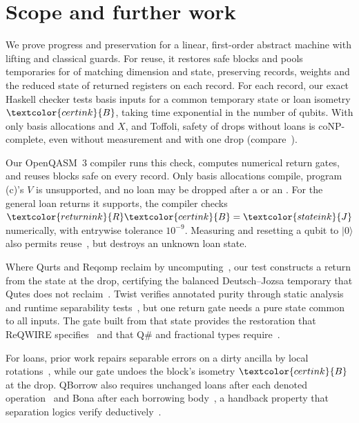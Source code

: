 \documentclass[acmsmall,11pt,screen,review,anonymous,nonacm]{acmart}
\begin{document}
\section{Scope and further work}\label{sec:status}

We prove progress and preservation for a linear, first-order abstract machine with lifting and classical
guards. For reuse, it restores safe blocks and pools temporaries for  of matching dimension and
state, preserving records, weights and the reduced state of returned registers on each record.
For each record, our exact Haskell checker tests basis inputs for a common temporary state
or loan isometry $\textcolor{certink}{B}$, taking time exponential in the number of qubits. With only basis allocations and
$X$,  and Toffoli,
safety of drops without loans is coNP-complete, even without measurement and with one drop
(compare~\cite[Cor.~3.1]{Liu2026Uncomputation}).

Our OpenQASM~3 compiler runs this check, computes numerical return gates, and reuses blocks safe on every record.
Only basis allocations compile, program (c)'s $V$ is unsupported, and no loan may be dropped after a
 or an . For the general loan returns it supports, the compiler checks $\textcolor{returnink}{R}\textcolor{certink}{B}=\textcolor{stateink}{J}$ numerically, with entrywise tolerance $10^{-9}$.
Measuring and resetting a qubit to $|0\rangle$ also permits reuse~\cite{DeCross2023QubitReuse,Hua2023CaQR}, but destroys an unknown loan state.

Where Qurts and Reqomp reclaim by uncomputing~\cite{Hirata2025Qurts,Paradis2024Reqomp}, our test constructs
 a return from the state at the drop, certifying the balanced Deutsch--Jozsa temporary that Qutes does not
reclaim~\cite[Defs.~2--6]{Faro2026Qutes}. Twist verifies annotated purity through static analysis and runtime
separability tests~\cite[\S1.3]{Yuan2022Twist}, but one return gate needs a pure state common to all inputs. The gate built from that state provides
the restoration that ReQWIRE
specifies~\cite[\S3]{Rand2019ReQWIRE} and that Q\# and fractional types
require~\cite{MicrosoftQsharpMemory,Chen2020Fractional}.

For loans, prior work repairs separable errors on a dirty ancilla by local rotations~\cite[\S5.2, Alg.~2]{Li2026AncillaSafety},
while our gate undoes the block's isometry $\textcolor{certink}{B}$ at the drop. QBorrow also requires unchanged loans after each
denoted operation~\cite[Def.~5.1]{Su2025Borrowing} and Bona after each borrowing body~\cite[Def.~3.2]{Xu2026Bona},
a handback property that separation logics verify deductively~\cite{Matsushita2026RapunSL,Su2024Heap}.
\end{document}
